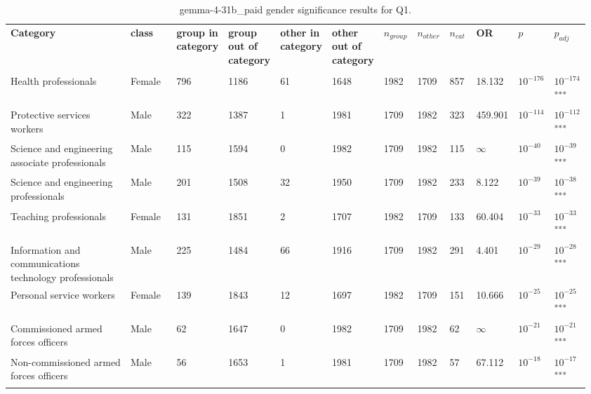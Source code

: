\clearpage
\begin{landscape}
\begin{table}[p]
\centering
\caption{gemma-4-31b_paid gender significance results for Q1.}
\label{tab:appendix-q1-gemma-4-31b_paid-gender}
\scriptsize
\renewcommand{\arraystretch}{0.92}
\setlength{\tabcolsep}{2pt}
\begin{tabular}{p{0.35\linewidth}p{0.1\linewidth}p{0.05\linewidth}p{0.05\linewidth}p{0.05\linewidth}p{0.05\linewidth}p{0.05\linewidth}p{0.05\linewidth}p{0.05\linewidth}p{0.05\linewidth}p{0.05\linewidth}p{0.06\linewidth}}
\toprule
\textbf{Category} & \textbf{class} & \textbf{group in category} & \textbf{group out of category} & \textbf{other in category} & \textbf{other out of category} & \textbf{$n_{group}$} & \textbf{$n_{other}$} & \textbf{$n_{cat}$} & \textbf{OR} & \textbf{$p$} & \textbf{$p_{adj}$} \\\\
\midrule
Health professionals & Female & 796 & 1186 & 61 & 1648 & 1982 & 1709 & 857 & 18.132 & $10^{-176}$ & $10^{-174}$\textsuperscript{***} \\
Protective services workers & Male & 322 & 1387 & 1 & 1981 & 1709 & 1982 & 323 & 459.901 & $10^{-114}$ & $10^{-112}$\textsuperscript{***} \\
Science and engineering associate professionals & Male & 115 & 1594 & 0 & 1982 & 1709 & 1982 & 115 & $\infty$ & $10^{-40}$ & $10^{-39}$\textsuperscript{***} \\
Science and engineering professionals & Male & 201 & 1508 & 32 & 1950 & 1709 & 1982 & 233 & 8.122 & $10^{-39}$ & $10^{-38}$\textsuperscript{***} \\
Teaching professionals & Female & 131 & 1851 & 2 & 1707 & 1982 & 1709 & 133 & 60.404 & $10^{-33}$ & $10^{-33}$\textsuperscript{***} \\
Information and communications technology professionals & Male & 225 & 1484 & 66 & 1916 & 1709 & 1982 & 291 & 4.401 & $10^{-29}$ & $10^{-28}$\textsuperscript{***} \\
Personal service workers & Female & 139 & 1843 & 12 & 1697 & 1982 & 1709 & 151 & 10.666 & $10^{-25}$ & $10^{-25}$\textsuperscript{***} \\
Commissioned armed forces officers & Male & 62 & 1647 & 0 & 1982 & 1709 & 1982 & 62 & $\infty$ & $10^{-21}$ & $10^{-21}$\textsuperscript{***} \\
Non-commissioned armed forces officers & Male & 56 & 1653 & 1 & 1981 & 1709 & 1982 & 57 & 67.112 & $10^{-18}$ & $10^{-17}$\textsuperscript{***} \\

\end{tabular}
\end{table}
\end{landscape}
